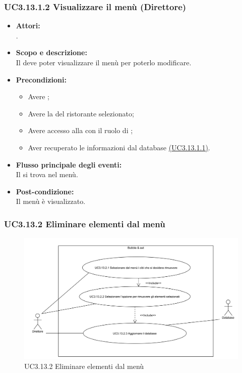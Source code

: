 \subsubsection{UC3.13.1.2 Visualizzare il menù (Direttore)} \label{UC3.13.1.2}

\begin{itemize}
	\item \textbf{Attori:}
	\\.
	\item \textbf{Scopo e descrizione:} 
	\\Il {} deve poter visualizzare il menù per poterlo modificare.
	\item \textbf{Precondizioni:}
	\begin{itemize}
		\item Avere ;
		\item Avere la  del ristorante selezionato;
		\item Avere accesso alla  con il ruolo di ;
		\item Aver recuperato le informazioni dal database \hyperref[UC3.13.1.1]{(UC3.13.1.1)}.
	\end{itemize}
	\item \textbf{Flusso principale degli eventi:}
	\\Il {} si trova nel menù.
	\item \textbf{Post-condizione:}
	\\Il menù è visualizzato.
\end{itemize}

\subsubsection{UC3.13.2 Eliminare elementi dal menù} \label{UC3.13.2}

\begin{figure}[H]
	\centering
	\includegraphics[width=15cm]{../../documenti/AnalisiDeiRequisiti/Diagrammi_img/uc3_13_2.png}
	\caption{UC3.13.2 Eliminare elementi dal menù}
\end{figure}

